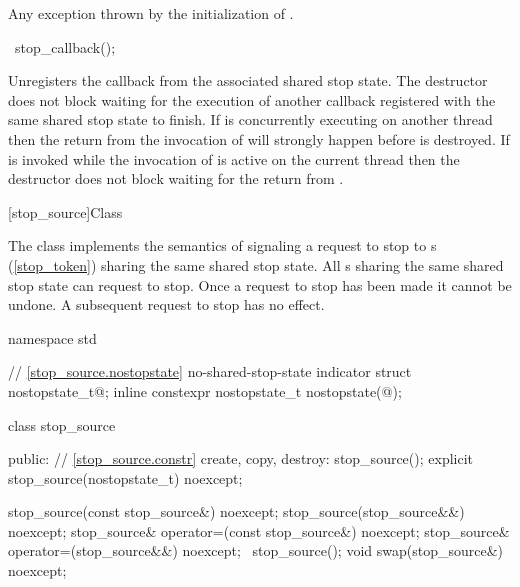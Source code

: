 {\begin{itemdescr}
  \pnum\throws Any exception thrown by the initialization of .
\end{itemdescr}

%
\begin{itemdecl}
~stop_callback();
\end{itemdecl}
\begin{itemdescr}
  \pnum\effects Unregisters the callback from the associated shared stop state.
                The destructor does not block waiting for the execution of another callback registered
                with the same shared stop state to finish.
                If  is concurrently executing on another thread then the return
                from the invocation of  will strongly happen before 
                 is destroyed.
                If  is invoked while the invocation of 
                is active on the current thread then the destructor does not block waiting
                for the return from .
\end{itemdescr}

%
[stop_source]{Class }

\pnum
{}%
The class  implements the semantics of signaling a request to stop
to s (\ref{stop_token}) sharing the same shared stop state.
All s sharing the same shared stop state can request to stop.
Once a request to stop has been made it cannot be undone.
A subsequent request to stop has no effect.

\begin{codeblock}
namespace std {
  // \ref{stop_source.nostopstate} no-shared-stop-state indicator
  struct nostopstate_t{@\seebelow@};
  inline constexpr nostopstate_t nostopstate(@\unspec@);

  class stop_source {
  public:
    // \ref{stop_source.constr} create, copy, destroy:
    stop_source();
    explicit stop_source(nostopstate_t) noexcept;

    stop_source(const stop_source&) noexcept;
    stop_source(stop_source&&) noexcept;
    stop_source& operator=(const stop_source&) noexcept;
    stop_source& operator=(stop_source&&) noexcept;
    ~stop_source();
    void swap(stop_source&) noexcept;

}}
\end{codeblock}}
